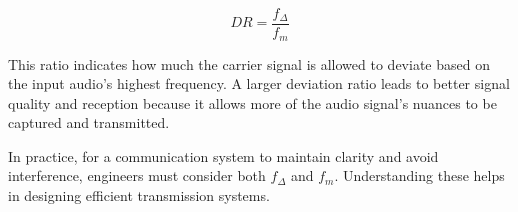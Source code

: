 \[
DR = \frac{f_{\Delta}}{f_m}
\]

This ratio indicates how much the carrier signal is allowed to deviate based on the input audio's highest frequency. A larger deviation ratio leads to better signal quality and reception because it allows more of the audio signal's nuances to be captured and transmitted.

In practice, for a communication system to maintain clarity and avoid interference, engineers must consider both \( f_{\Delta} \) and \( f_m \). Understanding these helps in designing efficient transmission systems.

